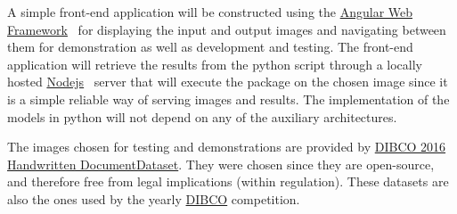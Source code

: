 \documentclass[a4paper, 12pt]{report}
\begin{document}
A simple front-end application will be constructed using the
\href{https://angular.io/}{Angular Web Framework}~\cite{angular_2022} for
displaying the input and output images and navigating between them for
demonstration as well as development and testing. The front-end application
will retrieve the results from the python script through a locally hosted
\href{https://nodejs.org/en/}{Nodejs}~\cite{nodejs_2022} server that will
execute the package on the chosen image since it is a simple reliable way of
serving images and results. The implementation of the models in python will not
depend on any of the auxiliary architectures. \par

The images chosen for testing and demonstrations are provided by
\href{https://vc.ee.duth.gr/h-dibco2016/}{DIBCO 2016 Handwritten
    DocumentDataset}. They were chosen since they are open-source, and therefore
free from legal implications (within regulation). These datasets are also the
ones used by the yearly
\href{https://dib.cin.ufpe.br/#!/resources/dibco}{DIBCO} competition.
\end{document}
